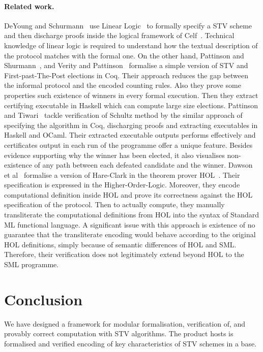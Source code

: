 \documentclass{llncs}
\begin{document}
\paragraph{\textbf{Related work.}} DeYoung and Schurmann~\cite{DBLP:conf/voteid/2011} use Linear Logic~\cite{DBLP:journals/apal/Girard93} to formally specify a STV scheme and then discharge proofs inside the logical framework of Celf~\cite{DBLP:conf/cade/Schack-NielsenS08}. Technical knowledge of linear logic is required to understand how the textual description of the protocol matches with the formal one. On the other hand,  Pattinson and Shurmann~\cite{DBLP:conf/ausai/PattinsonS15}, and Verity and Pattinson~\cite{DBLP:conf/acsw/VerityP17} formalise a simple version of STV and First-past-The-Post elections in Coq. Their approach reduces the gap between the informal protocol and the encoded counting rules. Also they prove some properties such existence of winners in every formal execution. Then they extract certifying executable in Haskell which can compute large size elections. Pattinson and Tiwari~\cite{DBLP:conf/itp/PattinsonT17} tackle verification of Schultz method by the similar approach of specifying the algorithm in Coq, discharging proofs and extracting executables in Haskell and OCaml. Their extracted executable outputs performs effectively and certificates output in each run of the programme offer a unique feature. Besides evidence supporting why the winner has been elected, it also visualises non-existence of any path between each defeated candidate and the winner. Dawson et al~\cite{DBLP:conf/voteid/DawsonGM15} formalise a version of Hare-Clark in the theorem prover HOL~\cite{hol4}. Their specification is expressed in the Higher-Order-Logic. Moreover, they encode computational definition inside HOL and prove its correctness against the HOL specification of the protocol.  Then to actually compute, they manually transliterate the computational definitions from HOL into the syntax of Standard ML functional language.  A significant issue with this approach is existence of no guarantee that  the transliterate encoding would behave according to the original HOL definitions, simply because of semantic differences of HOL and SML. Therefore, their verification does not legitimately extend beyond HOL to the SML programme. 


   
\section{Conclusion}
We have designed a framework for modular formalisation, verification of, and provably correct computation with STV algorithms. The product hosts is formalised and verified encoding of key characteristics of STV schemes in a base. 


\end{document}
